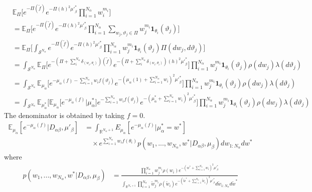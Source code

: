 \documentclass{article}
\begin{document}
\begin{align}
&\mathbb{E}_{\Pi}\Big[e^{-\Pi(\tilde{f})} e^{-\Pi(h)^2{\mu'}_\beta^{*}} \prod_{i=1}^{N_\alpha} w_i^{m_i} \Big] &\\
&= \mathbb{E}_{\Pi}\Big[e^{-\Pi(\tilde{f})} e^{-\Pi(h)^2{\mu'}_\beta^{*}} \prod_{i=1}^{N_\alpha} \sum_{w_j, \vartheta_j \in \Pi} w_j^{m_i} \mathbf{1}_{\theta_i}(\vartheta_j)\Big]& \\
&= \mathbb{E}_{\Pi}\Big[\int_{\mathcal{S}^{N_\alpha}} e^{-\Pi(\tilde{f})} e^{-\Pi(h)^2{\mu'}_\beta^{*}}  \prod_{i=1}^{N_\alpha} w_j^{m_i} \mathbf{1}_{\theta_i}(\vartheta_j) \Pi(dw_j, d\vartheta_j)\Big]& \\
&=  \int_{\mathcal{S}^{N_\alpha}} \mathbb{E}_{\Pi}\Big[ e^{-(\Pi+\sum_i^{N_\alpha}\delta_{(w_i, \theta_i)})(\tilde{f})} e^{-(\Pi+\sum_i^{N_\alpha}\delta_{(w_i, \theta_i)})(h)^2{\mu'}_\beta^{*}}\Big] \prod_{i=1}^{N_\alpha} w_j^{m_i} \mathbf{1}_{\theta_i}(\vartheta_j) \rho(dw_j)\lambda(d\vartheta_j) & \\
&=  \int_{\mathcal{S}^{N_\alpha}} \mathbb{E}_{\mu_\alpha}\Big[ e^{-\mu_\alpha(f) - \sum_{i=1}^{N_\alpha}w_if(\vartheta_j)} e^{-(\mu_\alpha(1) + \sum_{i=1}^{N_\alpha} w_i)^2{\mu'}_\beta^{*}}\Big] \prod_{i=1}^{N_\alpha} w_j^{m_i} \mathbf{1}_{\theta_i}(\vartheta_j) \rho(dw_j)\lambda(d\vartheta_j) &\\
&=  \int_{\mathcal{S}^{N_\alpha}} \mathbb{E}_{\mu_\alpha^*}\bigg[ \mathbb{E}_{\mu_\alpha} \Big[e^{-\mu_\alpha(f)}|\mu_\alpha^* \Big] e^{- \sum_{i=1}^{N_\alpha}w_if(\vartheta_j)} e^{-(\mu_\alpha^* + \sum_{i=1}^{N_\alpha} w_i)^2{\mu'}_\beta^{*}}\bigg] \prod_{i=1}^{N_\alpha} w_j^{m_i} \mathbf{1}_{\theta_i}(\vartheta_j) \rho(dw_j)\lambda(d\vartheta_j) &
\end{align}
The denominator is obtained by taking $f=0$.
\begin{align}
\mathbb{E}_{\mu_\alpha}[e^{-\mu_\alpha(f)}|D_{\alpha\beta}, \mu'_\beta] &= \int_{\mathbb{R}^{N_\alpha + 1}} E_{\mu_\alpha}[e^{-\mu_\alpha(f)}|\mu_\alpha^* = w^*]\\
&\quad \times e^{\sum_{i=1}^{N_\alpha}w_i f(\theta_i)} p(w_1, ..., w_{N_\alpha}, w^*|D_{\alpha\beta}, \mu_\beta) dw_{1:N_\alpha}dw^*
\end{align}
where
\begin{align}
p(w_1, ..., w_{N_\alpha}, w^*|D_{\alpha\beta}, \mu_\beta)&
= \frac{\prod_{i=1}^{N_\alpha} w_j^{m_i} \rho(w_i) e^{-(w^* + \sum_{i=1}^{N_\alpha} w_i)^2{\mu'}_\beta^{*}}}
{\int_{\mathbb{R}^{N_\alpha + 1}}\prod_{i=1}^{N_\alpha} \tilde{w}_j^{m_i} \rho(\tilde{w}_i) e^{-(\tilde{w}^* + \sum_{i=1}^{N_\alpha} \tilde{w}_i)^2{\mu'}_\beta^{*}} d\tilde{w}_{1:N_\alpha}d\tilde{w}^*}
\end{align}



\end{document}
